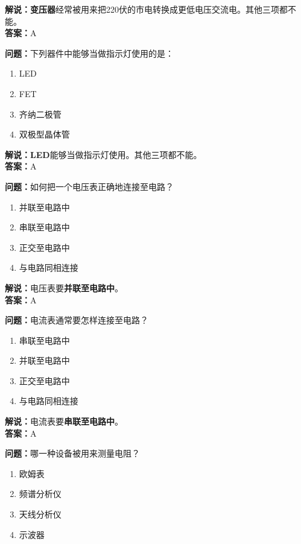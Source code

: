 \textbf{解说：变压器}经常被用来把220伏的市电转换成更低电压交流电。其他三项都不能。\\\textbf{答案：}A%

\textbf{问题：}下列器件中能够当做指示灯使用的是：

\begin{enumerate}[label=\Alph*), leftmargin=1cm]
	\item LED
	\item FET
	\item 齐纳二极管
	\item 双极型晶体管
\end{enumerate}

\textbf{解说：LED}能够当做指示灯使用。其他三项都不能。\\\textbf{答案：}A%

\textbf{问题：}如何把一个电压表正确地连接至电路？

\begin{enumerate}[label=\Alph*), leftmargin=1cm]
	\item 并联至电路中
	\item 串联至电路中
	\item 正交至电路中
	\item 与电路同相连接
\end{enumerate}

\textbf{解说：}电压表要\textbf{并联至电路中}。\\\textbf{答案：}A%


\textbf{问题：}电流表通常要怎样连接至电路？

\begin{enumerate}[label=\Alph*), leftmargin=1cm]
	\item 串联至电路中
	\item 并联至电路中
	\item 正交至电路中
	\item 与电路同相连接
\end{enumerate}

\textbf{解说：}电流表要\textbf{串联至电路中}。\\\textbf{答案：}A%


\textbf{问题：}哪一种设备被用来测量电阻？

\begin{enumerate}[label=\Alph*), leftmargin=1cm]
	\item 欧姆表
	\item 频谱分析仪
	\item 天线分析仪
	\item 示波器
\end{enumerate}

